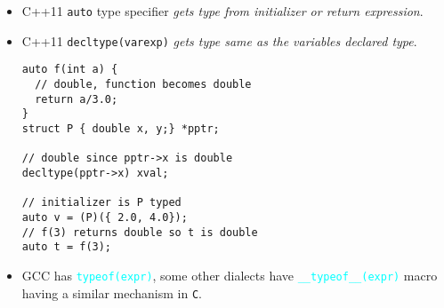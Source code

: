 \begin{itemize}
  \item C++11 \texttt{auto} type specifier \textit{gets type from initializer or return expression}.
  \item C++11 \texttt{decltype(varexp)} \textit{gets type same as the variables declared type}.
\begin{listing}[H]

\begin{verbatim}
auto f(int a) {
  // double, function becomes double  
  return a/3.0;
}  
struct P { double x, y;} *pptr;

// double since pptr->x is double
decltype(pptr->x) xval;

// initializer is P typed
auto v = (P)({ 2.0, 4.0});
// f(3) returns double so t is double
auto t = f(3);    
\end{verbatim}

\caption{}
\label{code:code2}
\end{listing}
  
  \item GCC has \textcolor{cyan}{\texttt{typeof(expr)}}, some other dialects have \textcolor{cyan}{\texttt{\_\_typeof\_\_(expr)}} macro having a similar mechanism in \texttt{C}.
\end{itemize}

\vspace*{\fill}
\columnbreak
